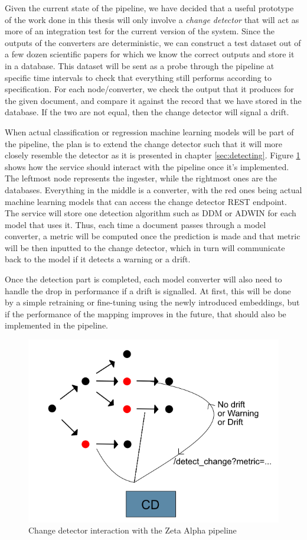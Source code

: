 \documentclass[12pt]{extreport}
\begin{document}
Given the current state of the pipeline, we have decided that a useful prototype of the work done in this thesis will only involve a \emph{change detector} that will act as more of an integration test for the current version of the system. Since the outputs of the converters are deterministic, we can construct a test dataset out of a few dozen scientific papers for which we know the correct outputs and store it in a database. This dataset will be sent as a probe through the pipeline at specific time intervals to check that everything still performs according to specification. For each node/converter, we check the output that it produces for the given document, and compare it against the record that we have stored in the database. If the two are not equal, then the change detector will signal a drift.

When actual classification or regression machine learning models will be part of the pipeline, the plan is to extend the change detector such that it will more closely resemble the detector as it is presented in chapter \ref{sec:detecting}. Figure \ref{fig:prototype} shows how the service should interact with the pipeline once it's implemented. The leftmost node represents the ingester, while the rightmost ones are the databases. Everything in the middle is a converter, with the red ones being actual machine learning models that can access the change detector REST endpoint. The service will store one detection algorithm such as DDM or ADWIN for each model that uses it. Thus, each time a document passes through a model converter, a metric will be computed once the prediction is made and that metric will be then inputted to the change detector, which in turn will communicate back to the model if it detects a warning or a drift.

Once the detection part is completed, each model converter will also need to handle the drop in performance if a drift is signalled. At first, this will be done by a simple retraining or fine-tuning using the newly introduced embeddings, but if the performance of the mapping improves in the future, that should also be implemented in the pipeline.

\begin{figure}[H]
\centering
\includegraphics[width=0.9\linewidth]{assets/prototype/prototype.png}
\caption{Change detector interaction with the Zeta Alpha pipeline}
\label{fig:prototype}
\end{figure}
\end{document}
